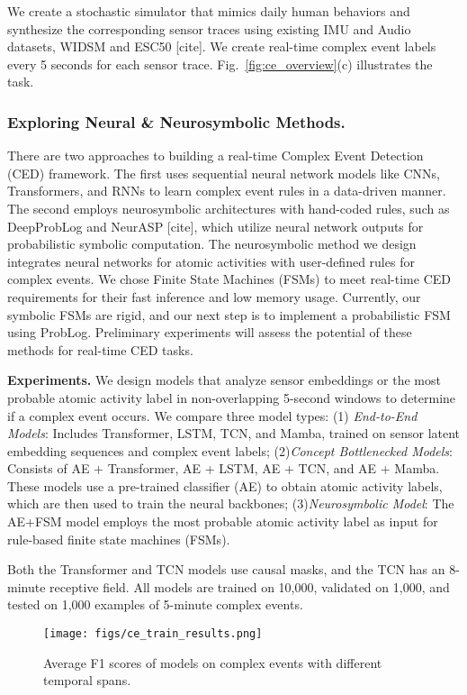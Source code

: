 We create a stochastic simulator that mimics daily human behaviors and synthesize the corresponding sensor traces using existing IMU and Audio datasets, WIDSM and ESC50 [cite]. We create real-time complex event labels every 5 seconds for each sensor trace. Fig.~\ref{fig:ce_overview}(c) illustrates the task.

\subsubsection{ Exploring Neural \& Neurosymbolic Methods.}
There are two approaches to building a real-time Complex Event Detection (CED) framework. The first uses sequential neural network models like CNNs, Transformers, and RNNs to learn complex event rules in a data-driven manner. The second employs neurosymbolic architectures with hand-coded rules, such as DeepProbLog and NeurASP [cite], which utilize neural network outputs for probabilistic symbolic computation. The neurosymbolic method we design integrates neural networks for atomic activities with user-defined rules for complex events. We chose Finite State Machines (FSMs) to meet real-time CED requirements for their fast inference and low memory usage. Currently, our symbolic FSMs are rigid, and our next step is to implement a probabilistic FSM using ProbLog. Preliminary experiments will assess the potential of these methods for real-time CED tasks.

\textbf{Experiments.} We design models that analyze sensor embeddings or the most probable atomic activity label in non-overlapping 5-second windows to determine if a complex event occurs. We compare three model types: (1) \textit{End-to-End Models}: Includes Transformer, LSTM, TCN, and Mamba, trained on sensor latent embedding sequences and complex event labels; (2)\textit{Concept Bottlenecked Models}: Consists of AE + Transformer, AE + LSTM, AE + TCN, and AE + Mamba. These models use a pre-trained classifier (AE) to obtain atomic activity labels, which are then used to train the neural backbones; (3)\textit{Neurosymbolic Model}: The AE+FSM model employs the most probable atomic activity label as input for rule-based finite state machines (FSMs).

Both the Transformer and TCN models use causal masks, and the TCN has an 8-minute receptive field. All models are trained on 10,000, validated on 1,000, and tested on 1,000 examples of 5-minute complex events.
\begin{figure}[t]
    \centering
\texttt{[image: figs/ce\_train\_results.png]}
    \caption{Average F1 scores of models on complex events with different temporal spans.}
    \label{fig:ce_train_results}
\end{figure}

